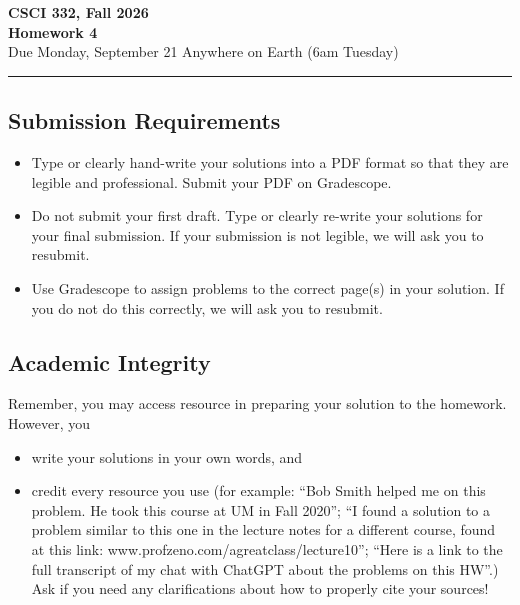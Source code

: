 \documentclass[11pt]{article}
\begin{document}
\begin{center}
\Large\textbf{CSCI 332, Fall 2026}%
\\
\LARGE\textbf{Homework 4}%
\\[0.5ex]
\large Due Monday, September 21 Anywhere on Earth (6am Tuesday)
\end{center}

\bigskip
\hrule
\bigskip

\subsection*{Submission Requirements}
\begin{itemize}
    \item Type or clearly hand-write your solutions into a PDF format so that they are legible and professional. Submit your PDF on Gradescope. 
    \item Do not submit your first draft. Type or clearly re-write your solutions for your final submission. If your submission is not legible, we will ask you to resubmit.
    \item Use Gradescope to assign problems to the correct page(s) in your solution. If you do not do this correctly, we will ask you to resubmit.
\end{itemize}

\subsection*{Academic Integrity}

Remember, you may access  resource in preparing your solution to the homework. However, you 
\begin{itemize}
    \item write your solutions in your own words, and
    \item credit every resource you use (for example: ``Bob Smith helped me on
    this problem. He took this course at UM in Fall 2020''; ``I found a solution
    to a problem similar to this one in the lecture notes for a different
    course, found at this link: www.profzeno.com/agreatclass/lecture10''; ``Here is a link to the full transcript of my chat with ChatGPT about the problems on this HW''.)
    Ask if you need any clarifications about how to properly cite your sources!
\end{itemize}




\newpage
\end{document}
